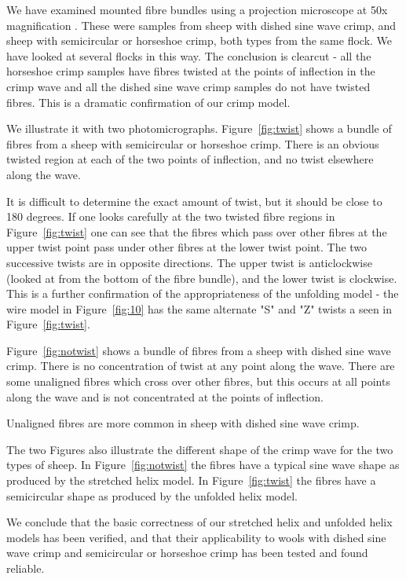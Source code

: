 \documentclass[titlepage,10pt]{article}  %
\begin{document}
We have examined mounted fibre bundles using a projection microscope at 50x magnification . These were samples from sheep with dished sine wave crimp, and sheep with semicircular or horseshoe crimp, both types from the same flock.  We have looked at several flocks in this way. The conclusion is clearcut - all the horseshoe crimp samples have fibres twisted at the points of inflection in the crimp wave and all the dished sine wave crimp samples do not have twisted fibres. This is a dramatic confirmation of our crimp model.

We illustrate it with two photomicrographs. Figure~\ref{fig:twist} shows a bundle of fibres from a sheep with semicircular or horseshoe crimp. There is an obvious twisted region at each of the two points of inflection, and no twist elsewhere along the wave.

  

It is difficult to determine the exact amount of twist, but it should be close to 180 degrees. If one looks carefully at the two twisted fibre regions in Figure~\ref{fig:twist} one can see that the fibres which pass over other fibres at the upper twist point pass under other fibres at the lower twist point.  The two successive twists are in opposite directions. The upper twist is anticlockwise (looked at from the bottom of the fibre bundle), and the lower twist is clockwise. This is a further confirmation of the appropriateness of the unfolding model - the wire model in Figure~\ref{fig:10} has the same alternate "S" and "Z" twists a seen in Figure~\ref{fig:twist}.

Figure~\ref{fig:notwist} shows a bundle of fibres from a sheep with dished sine wave crimp. There is no concentration of twist at any point along the wave. There are some unaligned fibres which cross over other fibres, but this occurs at all points along the wave and is not concentrated at the points of inflection.

  

Unaligned fibres are more common in sheep with dished sine wave crimp.

The two Figures also illustrate the different shape of the crimp wave for the two types of sheep. In Figure~\ref{fig:notwist} the fibres have a typical sine wave shape as produced by the stretched helix model. In Figure~\ref{fig:twist} the fibres have a semicircular shape as produced by the unfolded helix model.

We conclude that the basic correctness of our stretched helix and unfolded helix models has been verified, and that their applicability to wools with dished sine wave crimp and semicircular or horseshoe crimp has been tested and found reliable.
\end{document}
